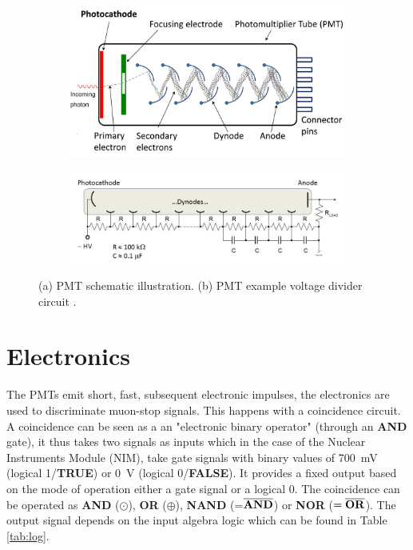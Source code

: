 \begin{figure}
\centering
   \begin{subfigure}[t]{0.49\linewidth}
  \centering
   \includegraphics[width=\linewidth]{./fig/PMT.png}
  \caption{}
\label{sfig:PMT}
  \end{subfigure}
   \begin{subfigure}[t]{0.49\linewidth}
  \centering
   \includegraphics[width=\linewidth]{./fig/PMT_Voltage_Divider.jpg}
  \caption{}
\label{sfig:PVD}
  \end{subfigure}
\caption{(a) PMT schematic illustration. (b) PMT example voltage divider circuit \cite{wiki}.}
\label{fig:PMT}
\end{figure}


\section{Electronics}

The PMTs emit short, fast, subsequent electronic impulses, the electronics are used to discriminate muon-stop signals. This happens with a coincidence circuit. A coincidence can be seen as a an "electronic binary operator" (through an \textbf{AND} gate), it thus takes two signals as inputs which in the case of the Nuclear Instruments Module (NIM), take gate signals with binary values of \SI{700}{\milli\volt} (logical 1/\textbf{TRUE}) or \SI{0}{\volt} (logical 0/\textbf{FALSE}). It provides a fixed output based on the mode of operation either a gate signal or a logical 0. The coincidence can be operated as \textbf{AND} ($\odot$), \textbf{OR} ($\oplus$), \textbf{NAND} (=$\overline{\text{\textbf{AND}}}$) or \textbf{NOR} ($=\overline{\text{\textbf{OR}}}$). The output signal depends on the input algebra logic which can be found in Table \ref{tab:log}.

